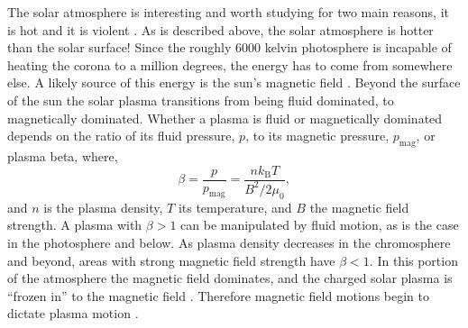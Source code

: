  
The solar atmosphere is interesting and worth studying for two main reasons, it is hot and it is violent  .
As is described above, the solar atmosphere is hotter than the solar surface!
Since the roughly 6000 kelvin photosphere is incapable  of heating the corona to a million degrees, the energy has to come from somewhere else.
A likely source of this energy is the sun's magnetic field \citep{Priest2014}.
Beyond the surface of the sun the solar plasma transitions from being fluid dominated, to magnetically dominated.
Whether a plasma is fluid or magnetically dominated depends on the ratio of its fluid pressure, $p$, to its magnetic pressure, $p_\text{mag}$, or plasma beta, where,
\begin{equation}
	\beta = \frac{p}{p_\text{mag}} = \frac{nk_\text{B}T}{B^2 / 2\mu_0},
\end{equation}
and $n$ is the plasma density, $T$ its temperature, and $B$ the magnetic field strength.
A plasma with $\beta>1$ can be manipulated by fluid motion, as is the case in the photosphere and below.
As plasma density decreases in the chromosphere and beyond, areas with strong magnetic field strength have $\beta<1$.  
In this portion of the atmosphere the magnetic field dominates, and the charged solar plasma is ``frozen in'' to the magnetic field .
Therefore magnetic field motions begin to dictate plasma motion \citep{Priest2014}.

